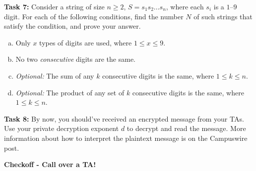 \documentclass[12pt,letterpaper]{article}
\begin{document}
\textbf{Task 7: }Consider a string of size $n \geq 2$, $S = s_1s_2...s_n$, where each $s_i$ is a $1$--$9$ digit. For each of the following conditions, find the number $N$ of such strings that satisfy the condition, and prove your answer.
\begin{enumerate}[a.]
    \item Only $x$ types of digits are used, where $1 \leq x \leq 9$.
    \begin{mdframed} \vspace{1cm} \end{mdframed}
    \item No two \textit{consecutive} digits are the same.
    \begin{mdframed} \vspace{1cm} \end{mdframed}
    \item \textit{Optional: }The sum of any $k$ consecutive digits is the same, where $1 \leq k \leq n$.
    \begin{mdframed} \vspace{2cm} \end{mdframed}
    \item \textit{Optional: }The product of any set of $k$ consecutive digits is the same, where $1 \leq k \leq n$.
    \begin{mdframed} \vspace{2cm} \end{mdframed}
\end{enumerate}

\textbf{Task 8:} By now, you should've received an encrypted message from your TAs. Use your private decryption exponent $d$ to decrypt and read the message. More information about how to interpret the plaintext message is on the Campuswire post.

\begin{mdframed} \vspace{2cm} \end{mdframed}

\textbf{Checkoff - Call over a TA!}
\end{document}
